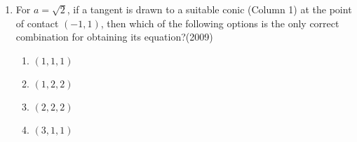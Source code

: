 \begin{enumerate}
\begin{table}[h!]
\begin{tabular}{|c|c|c|c|}
\hline
\end{tabular}
\end{table}
%
\begin{enumerate}
\item For $a =\sqrt{2}$, if a tangent is drawn to a suitable conic (Column 1) at the point of contact $(-1, 1)$, then which of the following
options is the only correct combination for obtaining its equation?\hfill{(2009)}
%
\begin{multicols}{4}
\begin{enumerate}
	\item $(1,1,1)$
    \item $(1,2,2)$
    \item $(2,2,2)$
    \item $(3,1,1)$
\end{enumerate}
\end{multicols}


\end{enumerate}
\end{enumerate}
